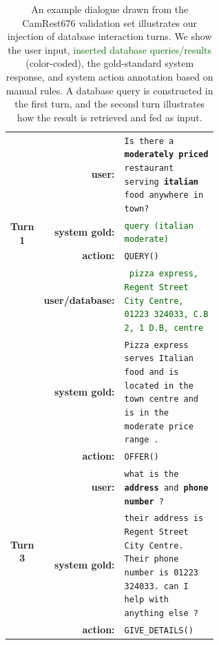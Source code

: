 \begin{table}[tp]
    \centering\scriptsize
    \begin{tabular}{crp{0.6\linewidth}}
        \toprule
         \multirow{4}{*}{\bf Turn 1}&\bf user:& \texttt{Is there a \textbf{moderately priced} restaurant serving \textbf{italian} food anywhere in town?} \\
         &\bf system gold: & \texttt{\textcolor{darkgreen}{query (italian moderate)}} \\
         &\bf action: & \texttt{QUERY()} \\
         \midrule
        \multirow{4}{*}{\bf Turn 2}&\bf user/database:& \texttt{\textcolor{darkgreen}{ pizza express, Regent Street City Centre, 01223 324033, C.B 2, 1 D.B, centre}}  \\
         &\bf system gold:& \texttt{Pizza express serves Italian food and is located in the town centre and is in the moderate price range .} \\        
        &\bf action: & \texttt{OFFER()} \\
         \midrule
        \multirow{4}{*}{\bf Turn 3}&\bf user:& \texttt{what is the \textbf{address} and \textbf{phone number} ?} \\
        &\bf system gold:& \texttt{their address is  Regent Street City Centre. Their phone number is 01223 324033. can I help with anything else ?} \\
         &\bf action: & \texttt{GIVE\_DETAILS()} \\
        \bottomrule
    \end{tabular}
    \vspace{-2mm}
    \caption{An example dialogue drawn from the CamRest676 validation set illustrates our injection of database interaction turns. We show the user input, \textcolor{darkgreen}{inserted database queries/results} (color-coded), the gold-standard system response, and system action annotation based on manual rules. A database query is constructed in the first turn, and the second turn illustrates how the result is retrieved and fed as input.}
    \label{05:tab:example}
\end{table}

